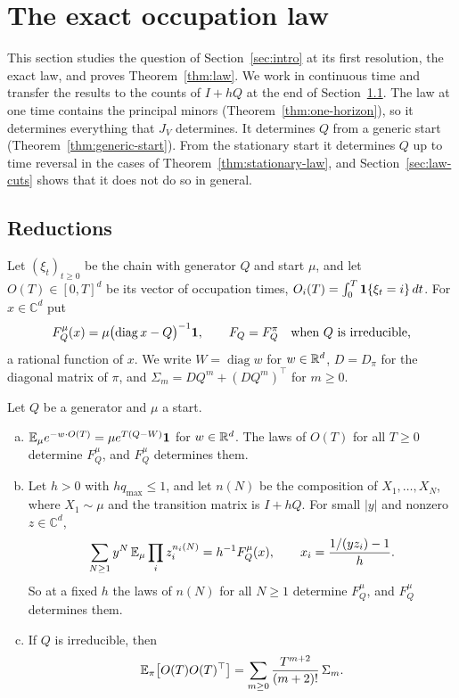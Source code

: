 \section{The exact occupation law}\label{sec:exactlaw}

This section studies the question of Section~\ref{sec:intro} at its first resolution, the exact
law, and proves Theorem~\ref{thm:law}. We work in continuous time and transfer the results to the
counts of $I+hQ$ at the end of Section~\ref{sec:law-reductions}. The law at one time contains the
principal minors (Theorem~\ref{thm:one-horizon}), so it determines everything that $J_V$
determines. It determines $Q$ from a generic start (Theorem~\ref{thm:generic-start}). From the
stationary start it determines $Q$ up to time reversal in the cases of
Theorem~\ref{thm:stationary-law}, and Section~\ref{sec:law-cuts} shows that it does not do so in
general.

\subsection{Reductions}\label{sec:law-reductions}

Let $(\xi_t)_{t\ge0}$ be the chain with generator $Q$ and start $\mu$, and let
$O(T)\in[0,T]^d$ be its vector of occupation times,
$O_i(T)=\int_0^T\mathbf{1}\{\xi_t=i\}\,dt$. For $x\in\mathbb C^d$ put
\[
 F^\mu_Q(x)=\mu\bigl(\operatorname{diag}x-Q\bigr)^{-1}\mathbf{1} ,\qquad F_Q=F^\pi_Q
 \quad\text{when $Q$ is irreducible,}
\]
a rational function of $x$. We write $W=\operatorname{diag}w$ for $w\in\mathbb{R}^d$, $D=D_\pi$ for the
diagonal matrix of $\pi$, and $\Sigma_m=DQ^m+(DQ^m)^\top$ for $m\ge0$.

\begin{lemma}[reductions]\label{lem:reductions}
Let $Q$ be a generator and $\mu$ a start.
\begin{enumerate}[(a)]
\item $\mathbb{E}_\mu e^{-w\cdot O(T)}=\mu e^{T(Q-W)}\mathbf{1}$ for $w\in\mathbb{R}^d$. The laws of $O(T)$ for all
$T\ge0$ determine $F^\mu_Q$, and $F^\mu_Q$ determines them.
\item Let $h>0$ with $hq_{\max}\le1$, and let $n(N)$ be the composition of $X_1,\dots,X_N$, where
$X_1\sim\mu$ and the transition matrix is $I+hQ$. For small $|y|$ and nonzero $z\in\mathbb C^d$,
\[
 \sum_{N\ge1}y^N\,\mathbb{E}_\mu\prod_iz_i^{n_i(N)}=h^{-1}F^\mu_Q(x),\qquad x_i=\frac{1/(yz_i)-1}h .
\]
So at a fixed $h$ the laws of $n(N)$ for all $N\ge1$ determine $F^\mu_Q$, and $F^\mu_Q$
determines them.
\item If $Q$ is irreducible, then
\[
 \mathbb{E}_\pi\bigl[O(T)O(T)^\top\bigr]=\sum_{m\ge0}\frac{T^{m+2}}{(m+2)!}\,\Sigma_m .
\]
\end{enumerate}
\end{lemma}

